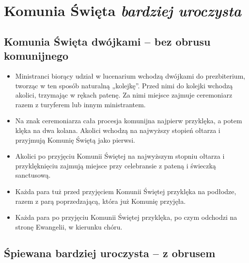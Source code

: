 	\section{Komunia Święta \textit{bardziej uroczysta}}
	
		\subsection{Komunia Święta dwójkami – bez obrusu komunijnego}
		
			\begin{itemize}
				\item Ministranci biorący udział w lucenarium wchodzą dwójkami do prezbiterium, tworząc w ten sposób naturalną „kolejkę”. Przed nimi do kolejki wchodzą akolici, trzymając w rękach patenę. Za nimi miejsce zajmuje ceremoniarz razem z turyferem lub innym ministrantem.
				\item Na znak ceremoniarza cała procesja komunijna najpierw przyklęka, a potem klęka na dwa kolana. Akolici wchodzą na najwyższy stopień ołtarza i przyjmują Komunię Świętą jako pierwsi.
				\item Akolici po przyjęciu Komunii Świętej na najwyższym stopniu ołtarza i przyklęknięciu zajmują miejsce przy celebransie z pateną i świeczką sanctusową.
				\item Każda para tuż przed przyjęciem Komunii Świętej przyklęka na podłodze, razem z parą poprzedzającą, która już Komunię przyjęła.
				\item Każda para po przyjęciu Komunii Świętej przyklęka, po czym odchodzi na stronę Ewangelii, w kierunku chóru.
			\end{itemize}
	
		\subsection{Śpiewana bardziej uroczysta – z obrusem}
		
